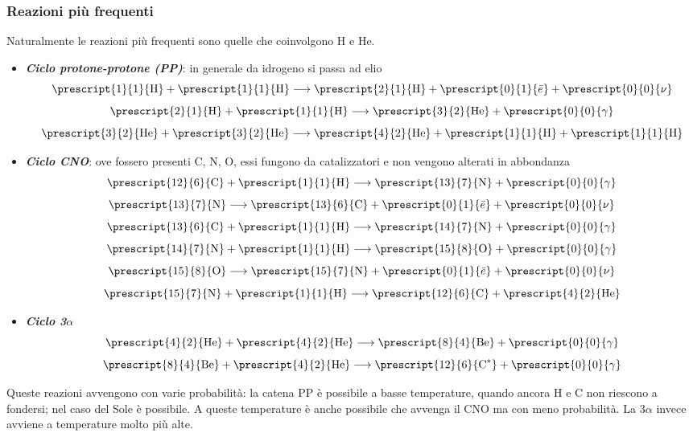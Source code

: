 \documentclass[a4paper,11pt]{article}
\begin{document}
\subsubsection{Reazioni più frequenti}
Naturalmente le reazioni più frequenti sono quelle che coinvolgono H e He.
\begin{itemize}
    \item \textbf{\textit{Ciclo protone-protone (PP)}}: in generale da idrogeno si passa ad elio
    $$\prescript{1}{1}{\text{H}}+\prescript{1}{1}{\text{H}}\longrightarrow \prescript{2}{1}{\text{H}}+\prescript{0}{1}{\bar e}+\prescript{0}{0}{\nu}$$
    $$\prescript{2}{1}{\text{H}}+\prescript{1}{1}{\text{H}}\longrightarrow \prescript{3}{2}{\text{He}}+\prescript{0}{0}{\gamma}$$
    $$\prescript{3}{2}{\text{He}}+\prescript{3}{2}{\text{He}}\longrightarrow \prescript{4}{2}{\text{He}}+\prescript{1}{1}{\text{H}}+\prescript{1}{1}{\text{H}}$$
    \item \textit{\textbf{Ciclo CNO}}: ove fossero presenti C, N, O, essi fungono da catalizzatori e non vengono alterati in abbondanza
    $$\prescript{12}{6}{\text{C}}+\prescript{1}{1}{\text{H}}\longrightarrow \prescript{13}{7}{\text{N}}+\prescript{0}{0}{\gamma}$$
    $$\prescript{13}{7}{\text{N}} \longrightarrow \prescript{13}{6}{\text{C}}+\prescript{0}{1}{\bar e}+\prescript{0}{0}{\nu}$$
    $$\prescript{13}{6}{\text{C}}+\prescript{1}{1}{\text{H}}\longrightarrow \prescript{14}{7}{\text{N}}+\prescript{0}{0}{\gamma}$$
    $$\prescript{14}{7}{\text{N}}+\prescript{1}{1}{\text{H}}\longrightarrow \prescript{15}{8}{\text{O}}+\prescript{0}{0}{\gamma}$$
    $$\prescript{15}{8}{\text{O}} \longrightarrow \prescript{15}{7}{\text{N}}+ \prescript{0}{1}{\bar e}+ \prescript{0}{0}{\nu}$$
    $$\prescript{15}{7}{\text{N}}+\prescript{1}{1}{\text{H}}\longrightarrow \prescript{12}{6}{\text{C}}+ \prescript{4}{2}{\text{He}}$$
    \item \textit{\textbf{Ciclo 3$\alpha$}}
    $$\prescript{4}{2}{\text{He}}+\prescript{4}{2}{\text{He}} \longrightarrow \prescript{8}{4}{\text{Be}}+ \prescript{0}{0}{\gamma}$$
    $$\prescript{8}{4}{\text{Be}}+ \prescript{4}{2}{\text{He}} \longrightarrow \prescript{12}{6}{\text{C}^*}+\prescript{0}{0}{\gamma}$$
\end{itemize}
Queste reazioni avvengono con varie probabilità: la catena PP è possibile a basse temperature, quando ancora H e C non riescono a fondersi; nel caso del Sole è possibile. A queste temperature è anche possibile che avvenga il CNO ma con meno probabilità. La $3\alpha$ invece avviene a temperature molto più alte.\\
\end{document}
